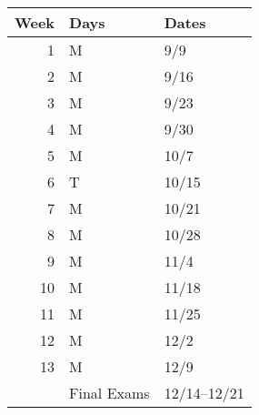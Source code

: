 \begin{center}\begin{tabular}{|r|l|l|}\hline
Week & Days & Dates\\\hline
  1  & M & 9/9 \\\hline
  2  & M & 9/16\\\hline
  3  & M & 9/23\\\hline
  4  & M & 9/30\\\hline
  5  & M & 10/7\\\hline
  6  & T & 10/15\\\hline
  7  & M & 10/21\\\hline
  8  & M & 10/28\\\hline
  9  & M & 11/4\\\hline
 10  & M & 11/18\\\hline
 11  & M & 11/25\\\hline
 12  & M & 12/2\\\hline
 13  & M & 12/9\\\hline
     & Final Exams & 12/14--12/21\\\hline

\end{tabular}\end{center}

